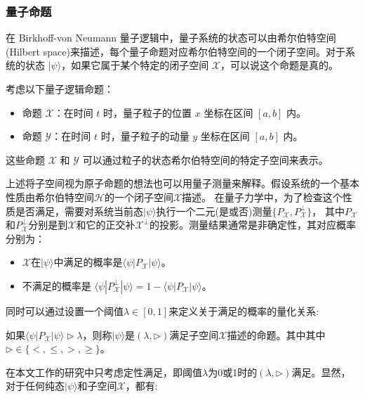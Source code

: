 \subsubsection*{量子命题}
\label{sec-logic}
在 Birkhoff-von Neumann 量子逻辑中，量子系统的状态可以由希尔伯特空间(Hilbert space)来描述，每个量子命题对应希尔伯特空间的一个闭子空间。对于系统的状态 \(|\psi\rangle\)，如果它属于某个特定的闭子空间 \( \mathcal{X} \)，可以说这个命题是真的。

\begin{example}\citep{2021}
    考虑以下量子逻辑命题：

\begin{itemize}
\item 命题 \( \mathcal{X} \)：在时间 \( t \) 时，量子粒子的位置 \( x \) 坐标在区间 \( [a, b] \) 内。
\item 命题 \( \mathcal{Y} \)：在时间 \( t \) 时，量子粒子的动量 \( y \) 坐标在区间 \( [a, b] \) 内。
\end{itemize}
这些命题 \( \mathcal{X} \) 和 \( \mathcal{Y} \) 可以通过粒子的状态希尔伯特空间的特定子空间来表示。
\end{example}


上述将子空间视为原子命题的想法也可以用量子测量来解释。假设系统的一个基本性质由希尔伯特空间$\mathcal{H}$的一个闭子空间$\mathcal{X}$描述。
在量子力学中，为了检查这个性质是否满足，需要对系统当前态$|\psi\rangle$执行一个二元(是或否)测量$\{P_{\mathcal{X}}, P_{\mathcal{X}}^{\perp}\}$，
其中$P_{\mathcal{X}}$和$P_{\mathcal{X}}^\perp$分别是到$\mathcal{X}$和它的正交补$\mathcal{X}^\perp$的投影。测量结果通常是非确定性，其对应概率分别为：
\begin{itemize}
    \item $\mathcal{X}$在$|\psi\rangle$中满足的概率是$\langle\psi|P_{\mathcal{X}}|\psi\rangle$。
    \item 不满足的概率是
    $\langle\psi|P_{\mathcal{X}}^\perp|\psi\rangle = 1 - \langle\psi|P_{\mathcal{X}}|\psi\rangle$。
\end{itemize}
同时可以通过设置一个阈值$\lambda \in [0,1]$来定义关于满足的概率的量化关系:

\begin{definition}\citep{2021}
    如果$\langle\psi|P_{\mathcal{X}}|\psi\rangle \rhd \lambda$，则称$|\psi\rangle$是$(\lambda, \rhd)$满足子空间$\mathcal{X}$描述的命题。其中其中$\rhd \in \{<, \leq, >, \geq\}$。 
\end{definition}

在本文工作的研究中只考虑定性满足，即阈值$\lambda$为0或1时的$(\lambda, \rhd)$满足。显然，对于任何纯态$|\psi\rangle$和子空间$\mathcal{X}$，都有:

